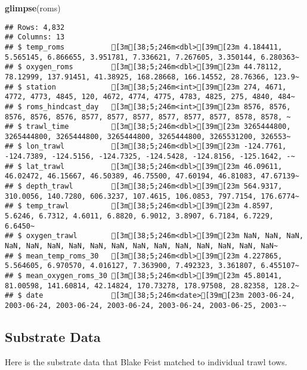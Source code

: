 \documentclass[
]{article}
\newenvironment{Shaded}{\begin{snugshade}}{\end{snugshade}}
\newcommand{\KeywordTok}[1]{\textcolor[rgb]{0.13,0.29,0.53}{\textbf{#1}}}
\newcommand{\NormalTok}[1]{#1}
\begin{document}
\begin{Shaded}
\begin{Highlighting}[]
\KeywordTok{glimpse}\NormalTok{(roms)}
\end{Highlighting}
\end{Shaded}

\begin{verbatim}
## Rows: 4,832
## Columns: 13
## $ temp_roms           [3m[38;5;246m<dbl>[39m[23m 4.184411, 5.565145, 6.866655, 3.951781, 7.336621, 7.267605, 3.350144, 6.280363~
## $ oxygen_roms         [3m[38;5;246m<dbl>[39m[23m 44.78112, 78.12999, 137.91451, 41.38925, 168.28668, 166.14552, 28.76366, 123.9~
## $ station             [3m[38;5;246m<int>[39m[23m 274, 4671, 4772, 4773, 4845, 120, 4672, 4774, 4775, 4783, 4825, 275, 4840, 484~
## $ roms_hindcast_day   [3m[38;5;246m<int>[39m[23m 8576, 8576, 8576, 8576, 8576, 8577, 8577, 8577, 8577, 8577, 8577, 8578, 8578, ~
## $ trawl_time          [3m[38;5;246m<dbl>[39m[23m 3265444800, 3265444800, 3265444800, 3265444800, 3265444800, 3265531200, 326553~
## $ lon_trawl           [3m[38;5;246m<dbl>[39m[23m -124.7761, -124.7389, -124.5156, -124.7325, -124.5428, -124.8156, -125.1642, -~
## $ lat_trawl           [3m[38;5;246m<dbl>[39m[23m 46.09611, 46.02472, 46.15667, 46.50389, 46.75500, 47.60194, 46.81083, 47.67139~
## $ depth_trawl         [3m[38;5;246m<dbl>[39m[23m 564.9317, 310.0056, 140.7280, 606.3237, 107.4615, 106.0853, 797.7154, 176.6774~
## $ temp_trawl          [3m[38;5;246m<dbl>[39m[23m 4.8597, 5.6246, 6.7312, 4.6011, 6.8820, 6.9012, 3.8907, 6.7184, 6.7229, 6.6450~
## $ oxygen_trawl        [3m[38;5;246m<dbl>[39m[23m NaN, NaN, NaN, NaN, NaN, NaN, NaN, NaN, NaN, NaN, NaN, NaN, NaN, NaN, NaN, NaN~
## $ mean_temp_roms_30   [3m[38;5;246m<dbl>[39m[23m 4.227865, 5.564605, 6.970570, 4.016127, 7.363900, 7.492323, 3.361807, 6.455107~
## $ mean_oxygen_roms_30 [3m[38;5;246m<dbl>[39m[23m 45.80141, 81.00598, 141.60814, 42.14824, 170.73278, 178.97508, 28.82358, 128.2~
## $ date                [3m[38;5;246m<date>[39m[23m 2003-06-24, 2003-06-24, 2003-06-24, 2003-06-24, 2003-06-24, 2003-06-25, 2003-~
\end{verbatim}

\hypertarget{substrate-data}{%
\subsection{Substrate Data}\label{substrate-data}}

Here is the substrate data that Blake Feist matched to individual trawl
tows.
\end{document}
